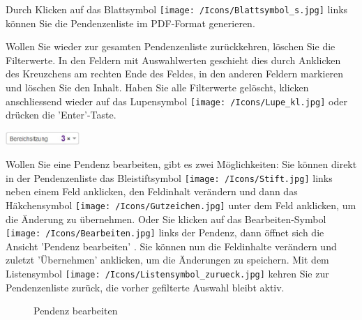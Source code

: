 Durch Klicken auf das Blattsymbol \texttt{[image: /Icons/Blattsymbol\_s.jpg]}  links können Sie die Pendenzenliste im PDF-Format generieren.

\vspace{\baselineskip}

Wollen Sie wieder zur gesamten Pendenzenliste zurückkehren, löschen Sie die Filterwerte. In den Feldern mit Auswahlwerten geschieht dies durch Anklicken des Kreuzchens  am rechten Ende des Feldes, in den anderen Feldern markieren und löschen Sie den Inhalt. Haben Sie alle Filterwerte gelöscht, klicken anschliessend wieder auf das Lupensymbol \texttt{[image: /Icons/Lupe\_kl.jpg]}  oder drücken die 'Enter'-Taste.

\begin{center}
\includegraphics[height=14pt]{../chapters/05_Sitzungswesen/pictures/5-5_PendenzenFeldLoeschen.jpg}
\end{center}

Wollen Sie eine Pendenz bearbeiten, gibt es zwei Möglichkeiten: Sie können direkt in der Pendenzenliste das Bleistiftsymbol \texttt{[image: /Icons/Stift.jpg]}  links neben einem Feld anklicken, den Feldinhalt verändern und dann das Häkchensymbol \texttt{[image: /Icons/Gutzeichen.jpg]}  unter dem Feld anklicken, um die Änderung zu übernehmen. Oder Sie klicken auf das Bearbeiten-Symbol \texttt{[image: /Icons/Bearbeiten.jpg]}  links der Pendenz, dann öffnet sich die Ansicht 'Pendenz bearbeiten' . Sie können nun die Feldinhalte verändern und zuletzt 'Übernehmen' anklicken, um die Änderungen zu speichern. Mit dem Listensymbol \texttt{[image: /Icons/Listensymbol\_zurueck.jpg]}  kehren Sie zur Pendenzenliste zurück, die vorher gefilterte Auswahl bleibt aktiv.

\begin{figure}[H]
\caption{Pendenz bearbeiten}
\end{figure}

